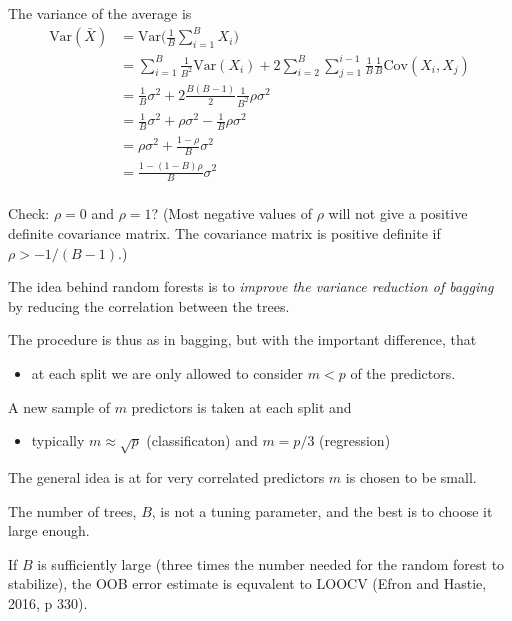 \documentclass[10pt,ignorenonframetext,]{beamer}
\providecommand{\tightlist}{%
  \setlength{\itemsep}{0pt}\setlength{\parskip}{0pt}}
\begin{document}
\begin{frame}

The variance of the average is
\[\begin{aligned} \text{Var}(\bar{X}) &= \text{Var}\Big( \frac{1}{B}\sum_{i=1}^B X_i \Big) \\
&= \sum_{i=1}^B \frac{1}{B^2} \text{Var} (X_i) + 2 \sum_{i=2}^B \sum_{j=1}^{i-1} \frac{1}{B} \frac{1}{B} \text{Cov} (X_i, X_j) \\
&= \frac{1}{B} \sigma^2 + 2 \frac{B(B-1)}{2}\frac{1}{B^2} \rho \sigma^2 \\
&= \frac{1}{B} \sigma^2 + \rho \sigma^2 - \frac{1}{B} \rho \sigma^2 \\
&= \rho \sigma^2 + \frac{1-\rho}{B}\sigma^2\\
&= \frac{1-(1-B)\rho}{B} \sigma^2\\ \end{aligned}\]

Check: \(\rho=0\) and \(\rho=1\)? (Most negative values of \(\rho\) will
not give a positive definite covariance matrix. The covariance matrix is
positive definite if \(\rho>-1/(B-1)\).)

\end{frame}

\begin{frame}

The idea behind random forests is to \emph{improve the variance
reduction of bagging} by reducing the correlation between the trees.

The procedure is thus as in bagging, but with the important difference,
that

\begin{itemize}
\tightlist
\item
  at each split we are only allowed to consider \(m<p\) of the
  predictors.
\end{itemize}

A new sample of \(m\) predictors is taken at each split and

\begin{itemize}
\tightlist
\item
  typically \(m\approx \sqrt p\) (classificaton) and \(m=p/3\)
  (regression)
\end{itemize}

The general idea is at for very correlated predictors \(m\) is chosen to
be small.

\end{frame}

\begin{frame}

The number of trees, \(B\), is not a tuning parameter, and the best is
to choose it large enough.

If \(B\) is sufficiently large (three times the number needed for the
random forest to stabilize), the OOB error estimate is equvalent to
LOOCV (Efron and Hastie, 2016, p 330).

\end{frame}
\end{document}
